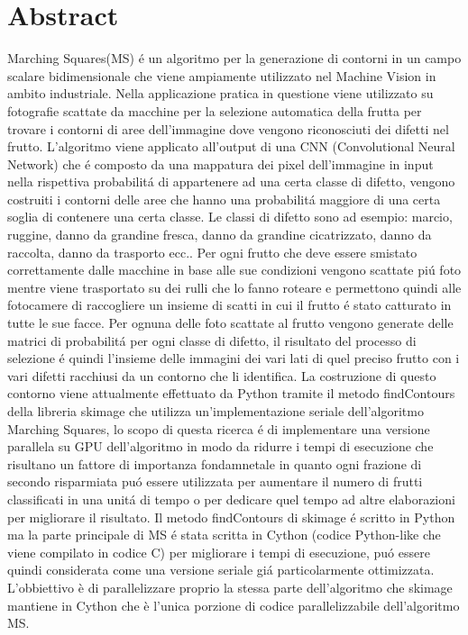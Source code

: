 \documentclass[12pt,a4paper]{report}
\begin{document}
\chapter{Abstract}
Marching Squares(MS) é un algoritmo per la generazione di contorni in un campo scalare bidimensionale che viene ampiamente utilizzato nel Machine Vision in ambito industriale. Nella applicazione pratica in questione viene utilizzato su fotografie scattate da macchine per la selezione automatica della frutta per trovare i contorni di aree dell'immagine dove vengono riconosciuti dei difetti nel frutto. L'algoritmo viene applicato all'output di una CNN (Convolutional Neural Network) che é composto da una mappatura dei pixel dell'immagine in input nella rispettiva probabilitá di appartenere ad una certa classe di difetto, vengono costruiti i contorni delle aree che hanno una probabilitá maggiore di una certa soglia di contenere una certa classe. Le classi di difetto sono ad esempio: marcio, ruggine, danno da grandine fresca, danno da grandine cicatrizzato, danno da raccolta, danno da trasporto ecc.. \newline
Per ogni frutto che deve essere smistato correttamente dalle macchine in base alle sue condizioni vengono scattate piú foto mentre viene trasportato su dei rulli che lo fanno roteare e permettono quindi alle fotocamere di raccogliere un insieme di scatti in cui il frutto é stato catturato in tutte le sue facce. Per ognuna delle foto scattate al frutto vengono generate delle matrici di probabilitá per ogni classe di difetto, il risultato del processo di selezione é quindi l'insieme delle immagini dei vari lati di quel preciso frutto con i vari difetti racchiusi da un contorno che li identifica. \newline La costruzione di questo contorno viene attualmente effettuato da Python tramite il metodo findContours della libreria skimage che utilizza un'implementazione seriale dell'algoritmo Marching Squares, lo scopo di questa ricerca é di implementare una versione parallela su GPU dell'algoritmo in modo da ridurre i tempi di esecuzione che risultano un fattore di importanza fondamnetale in quanto ogni frazione di secondo risparmiata puó essere utilizzata per aumentare il numero di frutti classificati in una unitá di tempo o per dedicare quel tempo ad altre elaborazioni per migliorare il risultato. 
Il metodo findContours di skimage é scritto in Python ma la parte principale di MS é stata scritta in Cython (codice Python-like che viene compilato in codice C) per migliorare i tempi di esecuzione, puó essere quindi considerata come una versione seriale giá particolarmente ottimizzata. \newline L'obbiettivo è di parallelizzare proprio la stessa parte dell'algoritmo che skimage mantiene in Cython che è l'unica porzione di codice parallelizzabile dell'algoritmo MS. \newline
\end{document}
